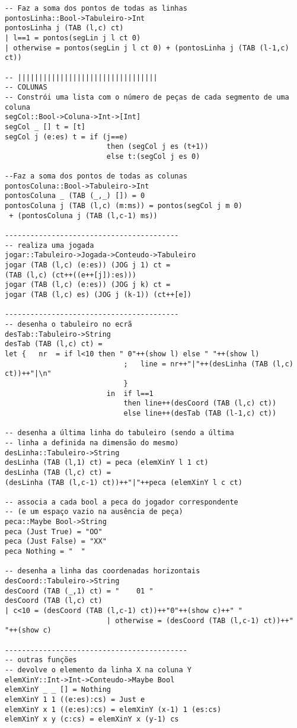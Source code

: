 \documentclass[a4paper,titlepage]{scrreprt}
\begin{document}
\begin{verbatim}
-- Faz a soma dos pontos de todas as linhas
pontosLinha::Bool->Tabuleiro->Int
pontosLinha j (TAB (l,c) ct)
| l==1 = pontos(segLin j l ct 0)
| otherwise = pontos(segLin j l ct 0) + (pontosLinha j (TAB (l-1,c) ct))

-- |||||||||||||||||||||||||||||||||
-- COLUNAS
-- Constrói uma lista com o número de peças de cada segmento de uma coluna
segCol::Bool->Coluna->Int->[Int]
segCol _ [] t = [t]
segCol j (e:es) t = if (j==e)
						then (segCol j es (t+1))
						else t:(segCol j es 0)

--Faz a soma dos pontos de todas as colunas
pontosColuna::Bool->Tabuleiro->Int
pontosColuna _ (TAB (_,_) []) = 0
pontosColuna j (TAB (l,c) (m:ms)) = pontos(segCol j m 0)
 + (pontosColuna j (TAB (l,c-1) ms))

-----------------------------------------
-- realiza uma jogada
jogar::Tabuleiro->Jogada->Conteudo->Tabuleiro
jogar (TAB (l,c) (e:es)) (JOG j 1) ct = 
(TAB (l,c) (ct++((e++[j]):es)))
jogar (TAB (l,c) (e:es)) (JOG j k) ct =
jogar (TAB (l,c) es) (JOG j (k-1)) (ct++[e])

-----------------------------------------
-- desenha o tabuleiro no ecrã
desTab::Tabuleiro->String
desTab (TAB (l,c) ct) =	
let	{	nr	= if l<10 then " 0"++(show l) else " "++(show l)
							;	line = nr++"|"++(desLinha (TAB (l,c) ct))++"|\n"
							}
						in	if l==1
							then line++(desCoord (TAB (l,c) ct))
							else line++(desTab (TAB (l-1,c) ct))

-- desenha a última linha do tabuleiro (sendo a última
-- linha a definida na dimensão do mesmo)
desLinha::Tabuleiro->String
desLinha (TAB (l,1) ct) = peca (elemXinY l 1 ct)
desLinha (TAB (l,c) ct) = 
(desLinha (TAB (l,c-1) ct))++"|"++peca (elemXinY l c ct)

-- associa a cada bool a peca do jogador correspondente
-- (e um espaço vazio na ausência de peça)
peca::Maybe Bool->String
peca (Just True) = "OO"
peca (Just False) = "XX"
peca Nothing = "  "

-- desenha a linha das coordenadas horizontais
desCoord::Tabuleiro->String
desCoord (TAB (_,1) ct) = "    01 "
desCoord (TAB (l,c) ct)
| c<10 = (desCoord (TAB (l,c-1) ct))++"0"++(show c)++" "
						| otherwise = (desCoord (TAB (l,c-1) ct))++" "++(show c)

-------------------------------------------
-- outras funções
-- devolve o elemento da linha X na coluna Y
elemXinY::Int->Int->Conteudo->Maybe Bool
elemXinY _ _ [] = Nothing
elemXinY 1 1 ((e:es):cs) = Just e
elemXinY x 1 ((e:es):cs) = elemXinY (x-1) 1 (es:cs)
elemXinY x y (c:cs) = elemXinY x (y-1) cs


\end{verbatim}
\end{document}
